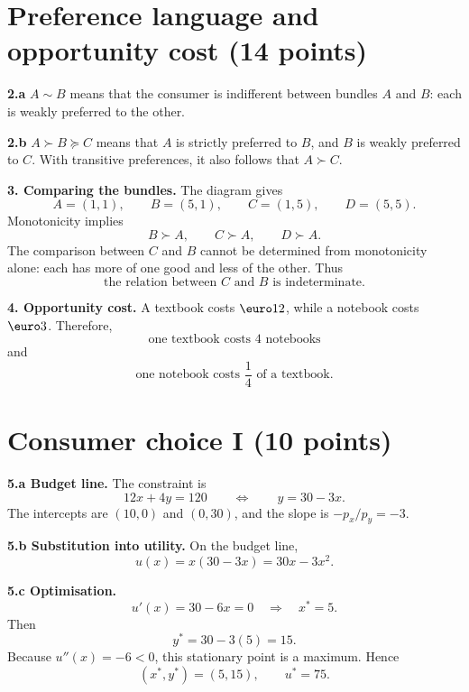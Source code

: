 \documentclass[11pt,a4paper]{article}
\begin{document}
\section{Preference language and opportunity cost \hfill (14 points)}

\textbf{2.a} \(A\sim B\) means that the consumer is indifferent between
bundles \(A\) and \(B\): each is weakly preferred to the other.

\textbf{2.b} \(A\succ B\succeq C\) means that \(A\) is strictly preferred to
\(B\), and \(B\) is weakly preferred to \(C\). With transitive preferences,
it also follows that \(A\succ C\).

\textbf{3. Comparing the bundles.} The diagram gives
\[
A=(1,1),\qquad B=(5,1),\qquad C=(1,5),\qquad D=(5,5).
\]
Monotonicity implies
\[
\boxed{B\succ A,\qquad C\succ A,\qquad D\succ A.}
\]
The comparison between \(C\) and \(B\) cannot be determined from monotonicity
alone: each has more of one good and less of the other. Thus
\[
\boxed{\text{the relation between \(C\) and \(B\) is indeterminate.}}
\]

\textbf{4. Opportunity cost.} A textbook costs \(\text{\euro}12\), while a
notebook costs \(\text{\euro}3\). Therefore,
\[
\boxed{\text{one textbook costs 4 notebooks}}
\]
and
\[
\boxed{\text{one notebook costs }\frac14\text{ of a textbook}.}
\]

\section{Consumer choice I \hfill (10 points)}

\textbf{5.a Budget line.} The constraint is
\[
12x+4y=120
\qquad\Longleftrightarrow\qquad
\boxed{y=30-3x}.
\]
The intercepts are \((10,0)\) and \((0,30)\), and the slope is
\(-p_x/p_y=-3\).

\textbf{5.b Substitution into utility.} On the budget line,
\[
u(x)=x(30-3x)=\boxed{30x-3x^2}.
\]

\textbf{5.c Optimisation.}
\[
u'(x)=30-6x=0
\quad\Longrightarrow\quad
x^*=5.
\]
Then
\[
y^*=30-3(5)=15.
\]
Because \(u''(x)=-6<0\), this stationary point is a maximum. Hence
\[
\boxed{(x^*,y^*)=(5,15),\qquad u^*=75.}
\]

\begin{center}
\end{center}
\end{document}

